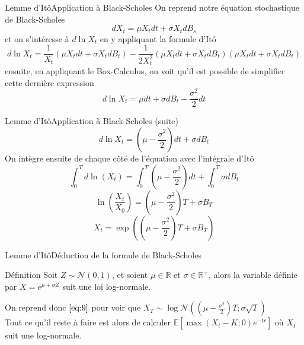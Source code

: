 \documentclass{beamer}
\newcommand{\1}{\mathmybb{1}}
\begin{document}
   \begin{frame}{Lemme d'Itô}{Application à Black-Scholes}
     On reprend notre équation stochastique de Black-Scholes
     \begin{equation}
       dX_{t} = \mu X_{t} dt + \sigma X_{t} dB_{s}
     \end{equation}
     \pause
     et on s'intéresse à $d \ln X_{t}$ en y appliquant la formule d'Itô
     \[
       d \ln X_{t} = \frac{1}{X_{t}} \left( \mu X_{t} dt + \sigma X_{t} dB_{t} \right) - \frac{1}{2X_{t}^{2}} \left( \mu X_{t} dt + \sigma X_{t} dB_{t} \right) \left( \mu X_{t}dt + \sigma X_{t} dB_{t}\right)
     \]
     \pause
     ensuite, en appliquant le Box-Calculus, on voit qu'il est possible de simplifier cette dernière expression
     \begin{equation}
       d \ln X_{t} =  \mu dt + \sigma dB_{t} - \frac{\sigma^{2}}{2} dt
     \end{equation}
   \end{frame}
   \begin{frame}{Lemme d'Itô}{Application à Black-Scholes (suite)}
     \[
       d \ln X_{t} = \left( \mu - \frac{\sigma^{2}}{2} \right) dt + \sigma dB_{t}
     \]
     \pause
     On intègre ensuite de chaque côté de l'équation avec l'intégrale d'Itô
     \[
       \int_{0}^{T} d \ln \left(  X_{t} \right) = \int_{0}^{T} \left(\mu - \frac{\sigma^{2}}{2} \right) dt + \int_{0}^{T} \sigma dB_{t}
     \]
     \pause
     \[
       \ln \left(\frac{X_{t}}{X_{0}} \right) = \left( \mu - \frac{\sigma^{2}}{2} \right) T + \sigma B_{T}
     \]
     \pause
     \begin{equation} \label{eq:9}
       X_{t} = \exp \left(  \left( \mu - \frac{\sigma^{2}}{2} \right) T + \sigma B_{T} \right)
     \end{equation}
   \end{frame}
   \begin{frame}{Lemme d'Itô}{Déduction de la formule de Black-Scholes}
     \begin{block}{Définition}
       Soit $Z \sim \mathcal{N}\left(0, 1 \right)$, et soient $\mu \in \mathbb{R}$ et $\sigma \in \mathbb{R}^{+}$, alors la variable définie par $ X = e^{\mu + \sigma Z}$ suit une loi log-normale.
     \end{block}
     On reprend donc $ \ref{eq:9} $ pour voir que $X_{T} \sim \log \mathcal{N} \left( \left( \mu - \frac{\sigma^{2}}{2} \right) T; \sigma \sqrt{T}  \right)$ \\
     \pause
     Tout ce qu'il reste à faire est alors de calculer $\mathbb{E}\left[\max(X_{t} - K; 0)e^{-tr}\right]$ où $ X_{t}$ suit une log-normale.

   \end{frame}
\end{document}

